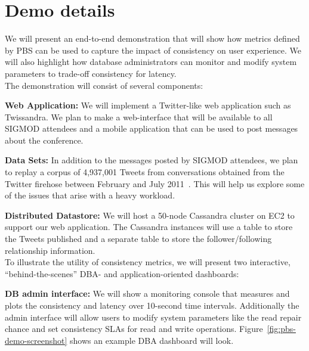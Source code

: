 \section{Demo details}
\label{sec:demo}


We will present an end-to-end demonstration that will show how metrics defined
by PBS can be used to capture the impact of consistency on user experience. We
will also highlight how database administrators can monitor and modify system
parameters to trade-off consistency for latency.\\[-.5em]

The demonstration will consist of several components:


\textbf{Web Application:} We will implement a Twitter-like web
application such as Twissandra. We plan to make a web-interface that
will be available to all SIGMOD attendees and a mobile application
that can be used to post messages about the conference.

\textbf{Data Sets:} In addition to the messages posted by SIGMOD
attendees, we plan to replay a corpus of 4,937,001 Tweets from
conversations obtained from the Twitter firehose between February and
July 2011~\cite{ritter2010unsupervised}.  This will help us explore
some of the issues that arise with a heavy workload.

\textbf{Distributed Datastore:} We will host a 50-node Cassandra
cluster on EC2 to support our web application. The Cassandra instances
will use a table to store the Tweets published and a separate table to
store the follower/following relationship information.\\[-.5em]


To illustrate the utility of consistency metrics, we will present two
interactive, ``behind-the-scenes'' DBA- and application-oriented
dashboards:

\textbf{DB admin interface:} We will show a monitoring console that
measures and plots the consistency and latency over 10-second time
intervals.  Additionally the admin interface will allow users to
modify system parameters like the read repair chance and set
consistency SLAs for read and write
operations. Figure~\ref{fig:pbs-demo-screenshot} shows an example DBA
dashboard will look.

